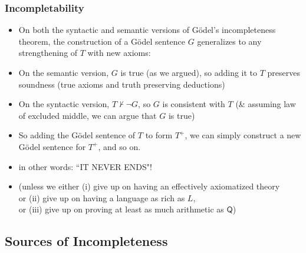 \begin{frame}
\frametitle{Incompletability}

\begin{itemize}[<+->]

\item On both the syntactic and semantic versions of G\"odel's incompleteness theorem, the construction of a G\"odel sentence $G$ generalizes to any strengthening of $T$ with new axioms:

\item On the semantic version, $G$ is true (as we argued), so adding it to $T$ preserves soundness (true axioms and truth preserving deductions)

\item On the syntactic version, $T \nvdash \neg G$, so $G$ is consistent with $T$ (\& assuming law of excluded middle, we can argue that $G$ is true)

\item So adding the G\"odel sentence of $T$ to form $T^+$, we can simply construct a new G\"odel sentence for $T^+$, and so on.

\item in other words: ``IT NEVER ENDS"! 
\item[] \footnotesize{(unless we either (i) give up on having an effectively axiomatized theory \\ or (ii) give up on having a language as rich as $L$, \\ or (iii) give up on proving at least as much arithmetic as $\mathsf{Q}$)}

\end{itemize}
\end{frame}


\subsection{Sources of Incompleteness}

